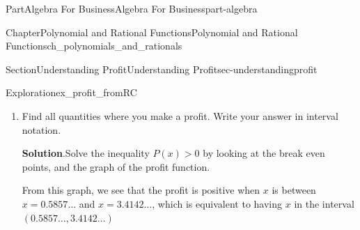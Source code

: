 \documentclass{tufte-book}
\newcommand{\blocktitlefont}{\relax}
\numberwithin{equation}{chapter}
\newcommand{\gt}{>}
\begin{document}
\begin{partptx}{Part}{Algebra For Business}{}{Algebra For Business}{}{}{part-algebra}
\begin{chapterptx}{Chapter}{Polynomial and Rational Functions}{}{Polynomial and Rational Functions}{}{}{ch_polynomials_and_rationals}
\begin{sectionptx}{Section}{Understanding Profit}{}{Understanding Profit}{}{}{sec-understandingprofit}
\begin{exploration}{Exploration}{}{ex_profit_fromRC}
\begin{enumerate}[font=\bfseries,label=(\alph*),ref=\alph*]
\begin{image}{0.25}{0.5}{0.25}{}
{
}%
\end{image}%
\item{}Find all quantities where you make a profit.  Write your answer in interval notation.%
\par\smallskip%
\noindent\textbf{\blocktitlefont Solution}.\hypertarget{ex_profit_fromRC-5-2}{}\quad{}Solve the inequality \(P(x)\gt 0\) by looking at the break even points, and the graph of the profit function.%
\par
From this graph, we see that the profit is positive when \(x\) is between \(x=0.5857\dots\) and \(x=3.4142\dots\), which is equivalent to having \(x\) in the interval \((0.5857\dots,3.4142\dots)\)%
\begin{image}{0.25}{0.5}{0.25}{}%
\end{image}
\end{enumerate}
\end{exploration}
\end{sectionptx}
\end{chapterptx}
\end{partptx}
\end{document}

